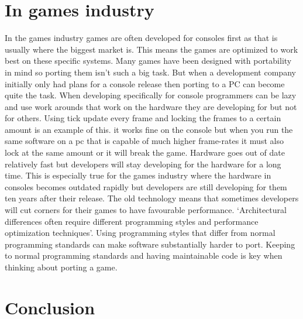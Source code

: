 \documentclass{scrartcl}
\begin{document}
\section{In games industry}

In the games industry games are often developed for consoles first as that is usually where the biggest market is. This means the games are optimized to work best on these specific systems. Many games have been designed with portability in mind so porting them isn’t such a big task. But when a development company initially only had plans for a console release then porting to a PC can become quite the task. When developing specifically for console programmers can be lazy and use work arounds that work on the hardware they are developing for but not for others.
\newline
\newline
Using tick update every frame and locking the frames to a certain amount is an example of this. it works fine on the console but when you run the same software on a pc that is capable of much higher frame-rates it must also lock at the same amount or it will break the game.
\newline
\newline
Hardware goes out of date relatively fast but developers will stay developing for the hardware for a long time. \cite{7000937} This is especially true for the games industry where the hardware in consoles becomes outdated rapidly but developers are still developing for them ten years after their release. The old technology means that sometimes developers will cut corners for their games to have favourable performance. ‘Architectural differences often require different programming styles and performance optimization techniques’. \cite{6808160} Using programming styles that differ from normal programming standards can make software substantially harder to port. \cite{766635} Keeping to normal programming standards and having maintainable code is key when thinking about porting a game.


\section{Conclusion}
\end{document}
